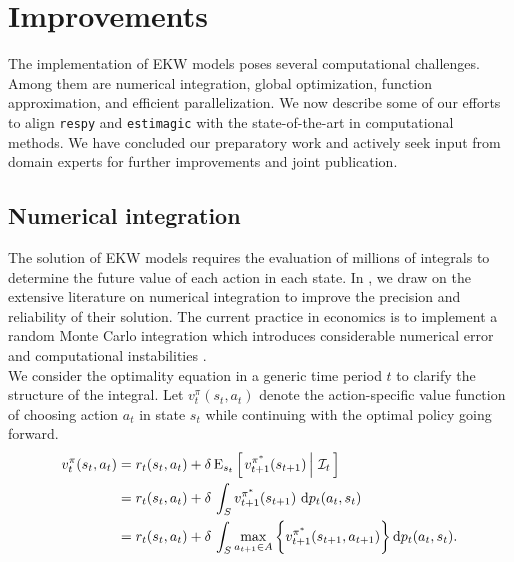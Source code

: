 \section{Improvements}\label{Computation}
The implementation of EKW models poses several computational challenges. Among them are numerical integration, global optimization, function approximation, and efficient parallelization. We now describe some of our efforts to align \verb+respy+ and \verb+estimagic+ with the state-of-the-art in computational methods. We have concluded our preparatory work and actively seek input from domain experts for further improvements and joint publication.
\subsection{Numerical integration}
The solution of EKW models requires the evaluation of millions of integrals to determine the future value of each action in each state. In \citet{Eisenhauer.2020c}, we draw on the extensive literature on numerical integration \citep{Davis.2007, Gerstner.1998} to improve the precision and reliability of their solution. The current practice in economics is to implement a random Monte Carlo integration which introduces considerable numerical error and computational instabilities \citep{Judd.2011}.\\

\noindent We consider the optimality equation in a generic time period $t$ to clarify the structure of the integral. Let $v^{\pi}_{t}(s_t, a_t)$ denote the action-specific value function of choosing action $a_t$ in state $s_t$ while continuing with the optimal policy going forward.
%
\begin{align*}
v^{\pi}_{t}(s_t, a_t) & = r_t(s_t, a_t) + \delta\,\mathrm{E}_{s_t} \left[\left.v^{\pi^*}_{t + 1}(s_{t + 1})\,\right\vert\,\mathcal{I}_t\,\right] \\
& =  r_t(s_t, a_t) + \delta\, \int_S v^{\pi^*}_{t + 1}(s_{t + 1})\, \mathop{}\!\mathrm{d} p_t(a_t, s_t)\\
& =  r_t(s_t, a_t) + \delta\, \int_S \max_{a_{t + 1} \in A}\bigg\{v^{\pi^*}_{t + 1}(s_{t + 1}, a_{t + 1})\bigg\}\mathop{}\!\mathrm{d} p_t(a_t, s_t).
\end{align*}


